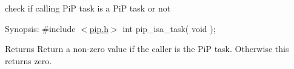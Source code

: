 check if calling Pi\-P task is a Pi\-P task or not

\begin{DoxyParagraph}{Synopsis\-:}
\#include $<$\hyperlink{pip_8h_source}{pip.\-h}$>$ int pip\-\_\-isa\-\_\-task( void );
\end{DoxyParagraph}
\begin{DoxyReturn}{Returns}
Return a non-\/zero value if the caller is the Pi\-P task. Otherwise this returns zero. 
\end{DoxyReturn}
